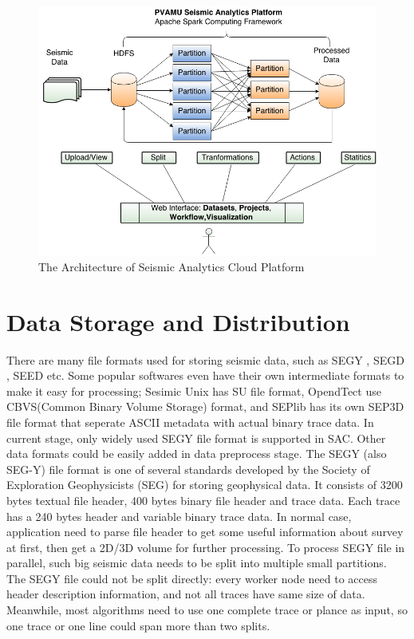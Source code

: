 \begin{figure}[H]
\centering
\includegraphics[scale=.50]{figures/SACArch.png}
\caption{The Architecture of Seismic Analytics Cloud Platform}
\label{SACArch}
\end{figure}

\section{Data Storage and Distribution}

There are many file formats used for storing seismic data, such as SEGY \cite{SEGYREV1}, SEGD \cite{SEGDREV21}, SEED \cite{IRISSEED} etc. Some popular softwares even have their own intermediate formats to make it easy for processing; Sesimic Unix has SU file format, OpendTect \cite{OpendTectMainPage} use CBVS(Common Binary Volume Storage) format, and SEPlib has its own SEP3D file format that seperate ASCII metadata with actual binary trace data. In current stage, only widely used SEGY file format is supported in SAC. Other data formats could be easily added in data preprocess stage.
The SEGY (also SEG-Y) \cite{SEGYREV1} file format is one of several standards developed by the Society of Exploration Geophysicists (SEG) for storing geophysical data. It consists of 3200 bytes textual file header, 400 bytes binary file header and trace data. Each trace has a 240 bytes header and variable binary trace data. In normal case, application need to parse file header to get some useful information about survey at first, then get a 2D/3D volume for further processing. To process SEGY file in parallel, such big seismic data needs to be split into multiple small partitions. The SEGY file could not be split directly: every worker node need to access header description information, and not all traces have same size of data. Meanwhile, most algorithms need to use one complete trace or plance as input, so one trace or one line could span more than two splits.   

